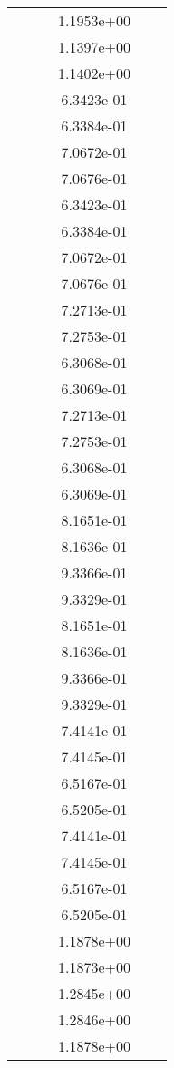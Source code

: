 \begin{xltabular}{\textwidth}{r|rS[table-format=1.3e+2]S[table-format=1.4e+2]S[table-format=1.4e+2]S[table-format=-1.5]}
&  &  & 1.1953e+00 & & \\
&  &  & 1.1397e+00 & & \\
&  &  & 1.1402e+00 & & \\
&  &  & 6.3423e-01 & & \\
&  &  & 6.3384e-01 & & \\
&  &  & 7.0672e-01 & & \\
&  &  & 7.0676e-01 & & \\
&  &  & 6.3423e-01 & & \\
&  &  & 6.3384e-01 & & \\
&  &  & 7.0672e-01 & & \\
&  &  & 7.0676e-01 & & \\
&  &  & 7.2713e-01 & & \\
&  &  & 7.2753e-01 & & \\
&  &  & 6.3068e-01 & & \\
&  &  & 6.3069e-01 & & \\
&  &  & 7.2713e-01 & & \\
&  &  & 7.2753e-01 & & \\
&  &  & 6.3068e-01 & & \\
&  &  & 6.3069e-01 & & \\
&  &  & 8.1651e-01 & & \\
&  &  & 8.1636e-01 & & \\
&  &  & 9.3366e-01 & & \\
&  &  & 9.3329e-01 & & \\
&  &  & 8.1651e-01 & & \\
&  &  & 8.1636e-01 & & \\
&  &  & 9.3366e-01 & & \\
&  &  & 9.3329e-01 & & \\
&  &  & 7.4141e-01 & & \\
&  &  & 7.4145e-01 & & \\
&  &  & 6.5167e-01 & & \\
&  &  & 6.5205e-01 & & \\
&  &  & 7.4141e-01 & & \\
&  &  & 7.4145e-01 & & \\
&  &  & 6.5167e-01 & & \\
&  &  & 6.5205e-01 & & \\
&  &  & 1.1878e+00 & & \\
&  &  & 1.1873e+00 & & \\
&  &  & 1.2845e+00 & & \\
&  &  & 1.2846e+00 & & \\
&  &  & 1.1878e+00 & & \\

\end{xltabular}
